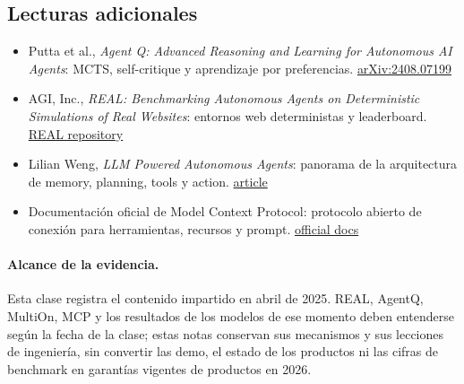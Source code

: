 \subsection{Lecturas adicionales}

\begin{itemize}
  \item Putta et al., \emph{Agent Q: Advanced Reasoning and Learning for Autonomous AI Agents}: MCTS, self-critique y aprendizaje por preferencias. \href{https://arxiv.org/abs/2408.07199}{arXiv:2408.07199}
  \item AGI, Inc., \emph{REAL: Benchmarking Autonomous Agents on Deterministic Simulations of Real Websites}: entornos web deterministas y leaderboard. \href{https://github.com/agi-inc/real}{REAL repository}
  \item Lilian Weng, \emph{LLM Powered Autonomous Agents}: panorama de la arquitectura de memory, planning, tools y action. \href{https://lilianweng.github.io/posts/2023-06-23-agent/}{article}
  \item Documentación oficial de Model Context Protocol: protocolo abierto de conexión para herramientas, recursos y prompt. \href{https://modelcontextprotocol.io/}{official docs}
\end{itemize}

\paragraph{Alcance de la evidencia.}
Esta clase registra el contenido impartido en abril de 2025. REAL, AgentQ, MultiOn, MCP y los resultados de los modelos de ese momento deben entenderse según la fecha de la clase; estas notas conservan sus mecanismos y sus lecciones de ingeniería, sin convertir las demo, el estado de los productos ni las cifras de benchmark en garantías vigentes de productos en 2026.


